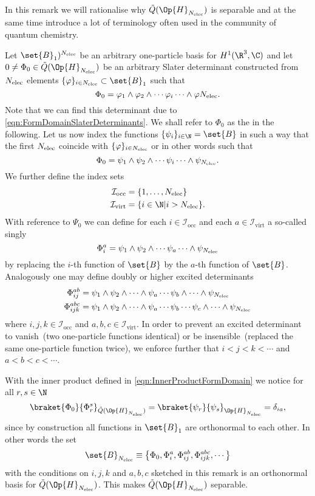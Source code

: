 \begin{rem}
	\label{rem:Determinants}
	In this remark we will rationalise why $\tilde{Q}(\Op{H}_{\Nelec})$ is separable
	and at the same time introduce a lot of terminology often used
	in the community of quantum chemistry.

	Let $\set{B}_1)^{\Nelec}$ be an arbitrary one-particle basis for $H^1(\R^3, \C)$
	and let $0 \neq \Phi_0 \in \tilde{Q}(\Op{H}_{\Nelec})$ be an arbitrary Slater determinant
	constructed from $N_\text{elec}$ elements $\{\varphi\}_{i \in \Nelec} \subset \set{B}_1$
	such that
	\[
		\Phi_0 = \varphi_1 \wedge \varphi_2 \wedge \cdots \varphi_i \cdots \wedge \varphi{\ensuremath N_\text{elec}}.
	\]
	Note that we can find this determinant due to \eqref{eqn:FormDomainSlaterDeterminants}.
	We shall refer to $\Phi_0$ as the 
	in the following.
	Let us now index the functions $\{\psi_i\}_{i \in \N} = \set{B}$ in such a way
	that the first $N_\text{elec}$ coincide with $\{\varphi\}_{i \in N_\text{elec}}$
	or in other words such that
	\[
		\Phi_0 = \psi_1 \wedge \psi_2 \wedge \cdots \psi_i \cdots \wedge \psi_{N_\text{elec}}.
	\]
	We further define the index sets
	\begin{align*}
		\mathcal{I}_\text{occ} &= \{1, \ldots, \Nelec\} \\
		\mathcal{I}_\text{virt} &= \{ i \in \N | i > \Nelec \}.
	\end{align*}
	With reference to $\Psi_0$ we can define
	for each $i \in \mathcal{I}_\text{occ}$ and each $a \in \mathcal{I}_\text{virt}$
	a so-called singly 
	\[
		\Phi_i^a = \psi_1 \wedge \psi_2 \wedge \cdots \psi_a \cdots \wedge \psi_{N_\text{elec}}
	\]
	by replacing the $i$-th function of $\set{B}$ by the $a$-th function of $\set{B}$.
	Analogously one may define doubly or higher excited determinants
	\begin{align*}
		\Phi_{ij}^{ab} &= \psi_1 \wedge \psi_2 \wedge \cdots \wedge \psi_a \cdots \psi_b
			\wedge \cdots \wedge \psi_{N_\text{elec}} \\
		\Phi_{ijk}^{abc} &= \psi_1 \wedge \psi_2 \wedge \cdots \wedge \psi_a \cdots \psi_b
			\cdots \psi_c \wedge \cdots \wedge \psi_{N_\text{elec}}
	\end{align*}
	where $i,j,k \in \mathcal{I}_\text{occ}$ and $a,b,c \in \mathcal{I}_\text{virt}$.
	In order to prevent an excited determinant to vanish~(two one-particle functions identical)
	or be insensible~(replaced the same one-particle function twice),
	we enforce further that $i < j < k < \cdots$ and $a < b < c < \cdots$.

	With the inner product defined in \eqref{eqn:InnerProductFormDomain} we notice
	for all $r,s \in \N$
	\[
		\braket{\Phi_0}{\Phi_r^s}_{\tilde{Q}(\Op{H}_{\Nelec})}
			= \braket{\psi_r}{\psi_s}_{\Op{H}_{\Nelec}} = \delta_{ia},
	\]
	since by construction all functions in $\set{B}_1$ are orthonormal to each other.
	In other words the set
	\[
		\set{B}_{\Nelec} \equiv
		\left\{
			\Phi_0, \Phi_i^a, \Phi_{ij}^{ab}, \Phi_{ijk}^{abc}, \cdots \right\}
	\]
	with the conditions on $i,j,k$ and $a,b,c$ sketched in this remark
	is an orthonormal basis for $\tilde{Q}(\Op{H}_{\Nelec})$.
	This makes $\tilde{Q}(\Op{H}_{\Nelec})$ separable.
\end{rem}
